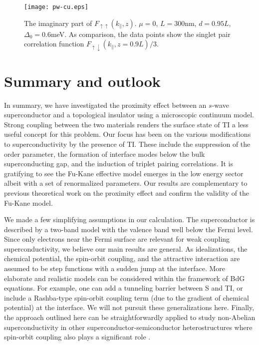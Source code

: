 \documentclass[11pt]{report}
\begin{document}
\begin{figure}
\texttt{[image: pw-cu.eps]}
\caption{The imaginary part of 
$F_{\uparrow\uparrow}(k_\parallel,z)$. $\mu=0$, $L=300$nm, $d=0.95L$, $\Delta_0=0.6$meV.
As comparison, the data points show the singlet pair correlation function 
$F_{\uparrow\downarrow}(k_\parallel,z=0.9L)/3$.
}\label{pw-cu}
\end{figure}

\section{Summary and outlook}
In summary, we have investigated the proximity effect between an $s$-wave superconductor
and a topological insulator using a microscopic continuum model. 
Strong coupling between the two materials renders the surface state of TI a less 
useful concept for this problem.
Our focus has been on the various modifications to superconductivity by the presence of TI. 
These include the suppression of the order parameter, the formation of interface modes
below the bulk superconducting gap, and the induction of triplet pairing correlations.
It is gratifying to see the Fu-Kane effective model emerges in the low energy sector
albeit with a set of renormalized parameters. Our results are complementary to
previous theoretical work on the proximity effect \cite{f-k,stan} and confirm the validity
of the Fu-Kane model.

We made a few simplifying assumptions in our calculation. The superconductor is described 
by a two-band model with the valence band well below the Fermi level. Since only 
electrons near the Fermi surface are relevant for weak coupling superconductivity, we 
believe our main results are general. As idealizations, the chemical 
potential, the spin-orbit coupling, and the attractive interaction are assumed to be 
step functions with a sudden jump at the interface. 
More elaborate and realistic models can be considered within the framework of BdG equations.
For example, one can add a tunneling barrier between S and TI, 
or include a Rashba-type spin-orbit coupling term 
(due to the gradient of chemical potential) at the interface. We will not 
pursuit these generalizations here.
Finally, the approach outlined here can be straightforwardly applied to 
study non-Abelian superconductivity in other superconductor-semiconductor
heterostructures where spin-orbit coupling also plays a significant role
\cite{roman,maryland,jason,mao1,mao2}.
\end{document}
